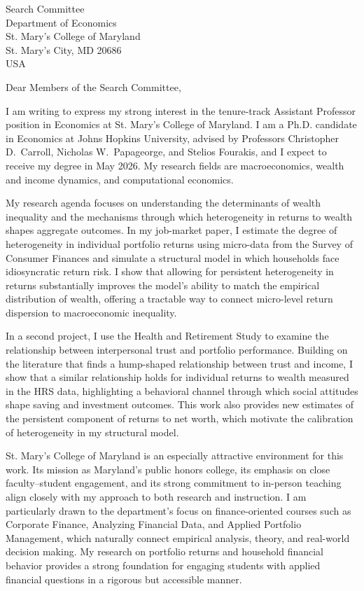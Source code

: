 \documentclass[11pt,letterpaper]{letter}
\begin{document}
\begin{letter}{Search Committee \\
Department of Economics \\
St. Mary’s College of Maryland \\
St. Mary’s City, MD 20686 \\ USA}

\opening{Dear Members of the Search Committee,}

I am writing to express my strong interest in the tenure-track Assistant Professor position in Economics at St. Mary’s College of Maryland. I am a Ph.D. candidate in Economics at Johns Hopkins University, advised by Professors Christopher D.~Carroll, Nicholas W.~Papageorge, and Stelios Fourakis, and I expect to receive my degree in May 2026. My research fields are macroeconomics, wealth and income dynamics, and computational economics.

My research agenda focuses on understanding the determinants of wealth inequality and the mechanisms through which heterogeneity in returns to wealth shapes aggregate outcomes. In my job-market paper, I estimate the degree of heterogeneity in individual portfolio returns using micro-data from the Survey of Consumer Finances and simulate a structural model in which households face idiosyncratic return risk. I show that allowing for persistent heterogeneity in returns substantially improves the model’s ability to match the empirical distribution of wealth, offering a tractable way to connect micro-level return dispersion to macroeconomic inequality.

In a second project, I use the Health and Retirement Study to examine the relationship between interpersonal trust and portfolio performance. Building on the literature that finds a hump-shaped relationship between trust and income, I show that a similar relationship holds for individual returns to wealth measured in the HRS data, highlighting a behavioral channel through which social attitudes shape saving and investment outcomes. This work also provides new estimates of the persistent component of returns to net worth, which motivate the calibration of heterogeneity in my structural model.

St. Mary’s College of Maryland is an especially attractive environment for this work. Its mission as Maryland’s public honors college, its emphasis on close faculty–student engagement, and its strong commitment to in-person teaching align closely with my approach to both research and instruction. I am particularly drawn to the department’s focus on finance-oriented courses such as Corporate Finance, Analyzing Financial Data, and Applied Portfolio Management, which naturally connect empirical analysis, theory, and real-world decision making. My research on portfolio returns and household financial behavior provides a strong foundation for engaging students with applied financial questions in a rigorous but accessible manner.


\end{letter}
\end{document}
